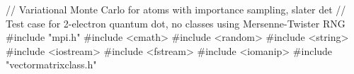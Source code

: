 \documentclass[%
oneside,                 %
final,                   %
10pt]{article}
\begin{document}
\bcppcod
// Variational Monte Carlo for atoms with importance sampling, slater det
// Test case for 2-electron quantum dot, no classes using Mersenne-Twister RNG
#include "mpi.h"
#include <cmath>
#include <random>
#include <string>
#include <iostream>
#include <fstream>
#include <iomanip>
#include "vectormatrixclass.h"
\end{document}
